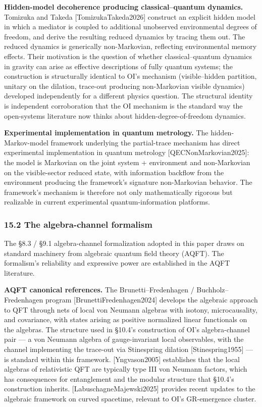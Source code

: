 \documentclass[
]{article}
\begin{document}
\textbf{Hidden-model decoherence producing classical--quantum dynamics.}
Tomizuka and Takeda {[}TomizukaTakeda2026{]} construct an explicit
hidden model in which a mediator is coupled to additional unobserved
environmental degrees of freedom, and derive the resulting reduced
dynamics by tracing them out. The reduced dynamics is generically
non-Markovian, reflecting environmental memory effects. Their motivation
is the question of whether classical--quantum dynamics in gravity can
arise as effective descriptions of fully quantum systems; the
construction is structurally identical to OI's mechanism
(visible--hidden partition, unitary on the dilation, trace-out producing
non-Markovian visible dynamics) developed independently for a different
physics question. The structural identity is independent corroboration
that the OI mechanism is the standard way the open-systems literature
now thinks about hidden-degree-of-freedom dynamics.

\textbf{Experimental implementation in quantum metrology.} The
hidden-Markov-model framework underlying the partial-trace mechanism has
direct experimental implementation in quantum metrology
{[}QECNonMarkovian2025{]}: the model is Markovian on the joint system +
environment and non-Markovian on the visible-sector reduced state, with
information backflow from the environment producing the framework's
signature non-Markovian behavior. The framework's mechanism is therefore
not only mathematically rigorous but realizable in current experimental
quantum-information platforms.

\hypertarget{the-algebra-channel-formalism}{%
\subsubsection{15.2 The algebra-channel
formalism}\label{the-algebra-channel-formalism}}

The §8.3 / §9.1 algebra-channel formalization adopted in this paper
draws on standard machinery from algebraic quantum field theory (AQFT).
The formalism's reliability and expressive power are established in the
AQFT literature.

\textbf{AQFT canonical references.} The Brunetti--Fredenhagen /
Buchholz--Fredenhagen program {[}BrunettiFredenhagen2024{]} develops the
algebraic approach to QFT through nets of local von Neumann algebras
with isotony, microcausality, and covariance, with states arising as
positive normalized linear functionals on the algebras. The structure
used in §10.4's construction of OI's algebra-channel pair --- a von
Neumann algebra of gauge-invariant local observables, with the channel
implementing the trace-out via Stinespring dilation
{[}Stinespring1955{]} --- is standard within this framework.
{[}Yngvason2005{]} establishes that the local algebras of relativistic
QFT are typically type III von Neumann factors, which has consequences
for entanglement and the modular structure that §10.4's construction
inherits. {[}LabuschagneMajewski2025{]} provides recent updates to the
algebraic framework on curved spacetime, relevant to OI's GR-emergence
cluster.
\end{document}
